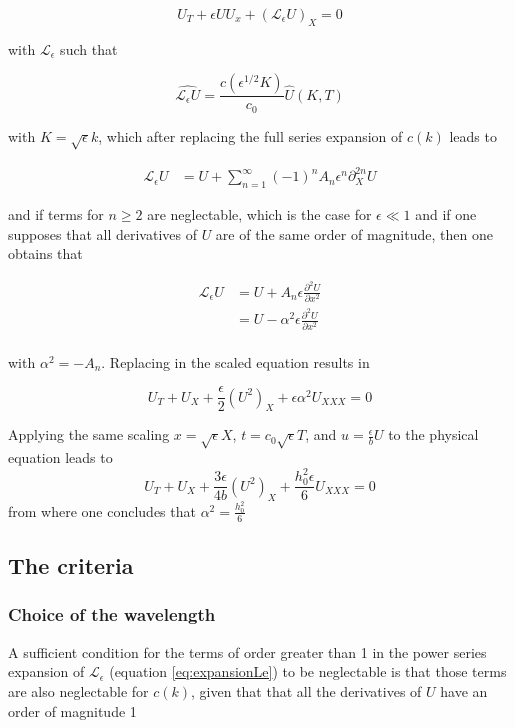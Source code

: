 $$ U_T + \epsilon U U_x+(\mathcal{L}_{\epsilon} U)_{X} = 0$$

\noindent with $\mathcal{L}_\epsilon$ such that 

$$ \hat{\mathcal{L}_\epsilon U} = \frac{c(\epsilon^{1/2} K)}{c_0} \hat{U}(K,T)$$ 

\noindent with $K=\sqrt{\epsilon} k$, which after replacing the full series expansion of $c(k)$ leads to

\begin{align}
  \label{eq:expansionLe}
    \mathcal{L}_\epsilon U &=U +\sum_{n=1}^\infty (-1)^n A_n \epsilon^n \partial_X^{2n} U    
\end{align}

\noindent and if terms for $n\geq2$ are neglectable, which is the case for $\epsilon \ll 1 $ and if one supposes that all derivatives of $U$ are of the same order of magnitude, then one obtains that

\begin{align*}
    \mathcal{L}_\epsilon U &= U + A_n \epsilon \frac{\partial^2 U}{\partial x^2} \\
    &= U - \alpha^2 \epsilon \frac{\partial^2 U}{\partial x^2} \\
\end{align*}

\noindent with $\alpha^2 = - A_n$. Replacing in the scaled equation results in

$$U_T + U_X + \frac{\epsilon}{2} (U^2)_X + \epsilon\alpha^2U_{XXX} = 0$$

\indent Applying the same scaling $x=\sqrt{\epsilon} X$, $t =c_0 \sqrt{\epsilon} T$, and $u = \frac{\epsilon}{ b} U$ to the physical equation leads to $$U_T + U_X + \frac{3\epsilon}{4b} (U^2)_X + \frac{h_0^2\epsilon}{6}U_{XXX} = 0$$
from where one concludes that $ \alpha^2 = \frac{h_0^2}{6} $

\subsection{The criteria}

\subsubsection{Choice of the wavelength}

\indent A sufficient condition for the terms of order greater than 1 in the power series expansion of $\mathcal{L}_\epsilon$  (equation \eqref{eq:expansionLe}) to be neglectable is that those terms are also neglectable for $c(k)$, given that that all the derivatives of $U$ have an order of magnitude 1

